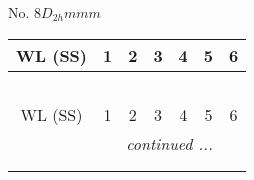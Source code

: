 \documentclass[fleqn,9pt,landscape]{jsarticle}
\begin{document}
\newpage
No. 8\quad$D_{2h}$\quad$mmm$\quad[ orthorhombic ]
\begin{center}
\renewcommand{\arraystretch}{1.2}
\begin{longtable}{ccccccc}
 \hline \hline
WL (SS) & 1 & 2 & 3 & 4 & 5 & 6 \\ \hline \endfirsthead

\multicolumn{6}{l}{\tablename\ \thetable{}} \\
 \hline \hline
WL (SS) & 1 & 2 & 3 & 4 & 5 & 6 \\ \hline \endhead

 \hline \hline
\multicolumn{6}{r}{\footnotesize\it continued ...} \\ \endfoot

 \hline \hline
\multicolumn{6}{r}{} \\ \endlastfoot


\end{longtable}
\end{center}
\end{document}
